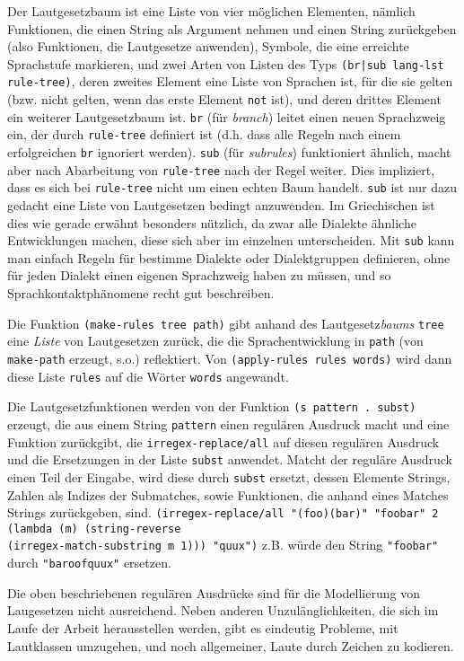 \documentclass[12pt,a4paper,normalheadings,bibliography=totoc]{scrartcl}
\def\tt#1{\texttt{#1}}
\begin{document}
Der Lautgesetzbaum ist eine Liste von vier möglichen Elementen, nämlich
Funktionen, die einen String als Argument nehmen und einen String zurückgeben
(also Funktionen, die Lautgesetze anwenden),
Symbole, die eine erreichte Sprachstufe markieren,
und zwei Arten von Listen des Typs \tt{(br|sub lang-lst rule-tree)},
deren zweites Element eine Liste von Sprachen ist,
für die sie gelten (bzw. nicht gelten, wenn das erste Element \tt{not} ist),
und deren drittes Element ein weiterer Lautgesetzbaum ist.
\tt{br} (für \emph{branch}) leitet einen neuen Sprachzweig ein,
der durch \tt{rule-tree} definiert ist
(d.h. dass alle Regeln nach einem erfolgreichen \tt{br} ignoriert werden).
\tt{sub} (für \emph{subrules}) funktioniert ähnlich,
macht aber nach Abarbeitung von \tt{rule-tree}
nach der Regel weiter.
Dies impliziert,
dass es sich bei \tt{rule-tree} nicht um einen echten Baum handelt.
\tt{sub} ist nur dazu gedacht eine Liste von Lautgesetzen bedingt anzuwenden.
Im Griechischen ist dies wie gerade erwähnt besonders nützlich,
da zwar alle Dialekte ähnliche Entwicklungen machen,
diese sich aber im einzelnen unterscheiden.
Mit \tt{sub} kann man einfach Regeln für bestimme Dialekte oder
Dialektgruppen definieren, ohne für jeden Dialekt einen eigenen Sprachzweig
haben zu müssen,
und so Sprachkontaktphänomene recht gut beschreiben.

Die Funktion \tt{(make-rules tree path)}
gibt anhand des Lautgesetz\emph{baums} \tt{tree} eine \emph{Liste}
von Lautgesetzen zurück,
die die Sprachentwicklung in \tt{path} (von \tt{make-path} erzeugt, s.o.)
reflektiert.
Von \tt{(apply-rules rules words)} wird dann diese Liste \tt{rules}
auf die Wörter \tt{words} angewandt.

Die Lautgesetzfunktionen werden von der Funktion \tt{(s pattern . subst)}
erzeugt,
die aus einem String \tt{pattern} einen regulären Ausdruck macht
und eine Funktion zurückgibt,
die \tt{irregex-replace/all} auf diesen regulären Ausdruck
und die Ersetzungen in der Liste \tt{subst} anwendet.
Matcht der reguläre Ausdruck einen Teil der Eingabe,
wird diese durch \tt{subst} ersetzt,
dessen Elemente Strings, Zahlen als Indizes der Submatches, sowie
Funktionen, die anhand eines Matches Strings zurückgeben, sind.
\tt{(irregex-replace/all "(foo)(bar)" "foobar" 2 (lambda (m)
    (string-reverse\\ (irregex-match-substring m 1))) "quux")}
z.B. würde den String \tt{"foobar"} durch \tt{"baroofquux"} ersetzen.

Die oben beschriebenen regulären Ausdrücke
sind für die Modellierung von Laugesetzen nicht ausreichend.
Neben anderen Unzulänglichkeiten,
die sich im Laufe der Arbeit herausstellen werden,
gibt es eindeutig Probleme, mit Lautklassen umzugehen,
und noch allgemeiner, Laute durch Zeichen zu kodieren.
\end{document}
